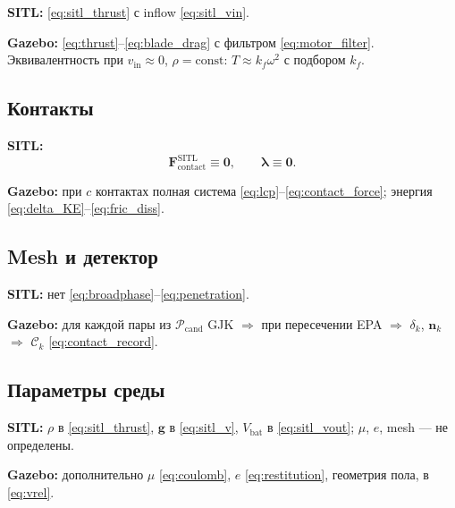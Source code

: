 \documentclass[a4paper,11pt]{article}
\newcommand{\code}[1]{\texttt{\detokenize{#1}}}
\newcommand{\vect}[1]{\bm{#1}}
\begin{document}
\textbf{SITL:} \eqref{eq:sitl_thrust} с inflow \eqref{eq:sitl_vin}.

\textbf{Gazebo:} \eqref{eq:thrust}--\eqref{eq:blade_drag} с фильтром
\eqref{eq:motor_filter}. Эквивалентность при $v_{\mathrm{in}} \approx 0$,
$\rho=\mathrm{const}$: $T \approx k_f \omega^2$ с подбором $k_f$.

\subsection{Контакты}

\textbf{SITL:}
\begin{equation}
  \vect{F}_{\mathrm{contact}}^{\mathrm{SITL}} \equiv \vect{0},
  \qquad
  \vect{\lambda} \equiv \vect{0}.
  \label{eq:sitl_no_contact}
\end{equation}

\textbf{Gazebo:} при $c$ контактах полная система \eqref{eq:lcp}--\eqref{eq:contact_force};
энергия \eqref{eq:delta_KE}--\eqref{eq:fric_diss}.

\subsection{Mesh и детектор}

\textbf{SITL:} нет \eqref{eq:broadphase}--\eqref{eq:penetration}.

\textbf{Gazebo:} для каждой пары из $\mathcal{P}_{\mathrm{cand}}$
GJK $\Rightarrow$ при пересечении EPA $\Rightarrow$ $\delta_k$, $\vect{n}_k$
$\Rightarrow$ $\mathcal{C}_k$ \eqref{eq:contact_record}.

\subsection{Параметры среды}

\textbf{SITL:} $\rho$ в \eqref{eq:sitl_thrust}, $\vect{g}$ в \eqref{eq:sitl_v},
$V_{\mathrm{bat}}$ в \eqref{eq:sitl_vout}; $\mu$, $e$, mesh --- не определены.

\textbf{Gazebo:} дополнительно $\mu$ \eqref{eq:coulomb}, $e$ \eqref{eq:restitution},
геометрия пола, \code{Wind} в \eqref{eq:vrel}.
\end{document}
